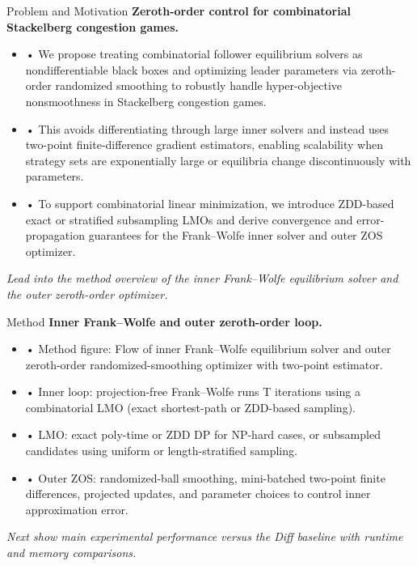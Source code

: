 \documentclass{beamer}
\begin{document}
\begin{frame}{Problem and Motivation}
    \textbf{Zeroth-order control for combinatorial Stackelberg congestion games.}
    \vspace{1em}
    \begin{itemize}
        \item • We propose treating combinatorial follower equilibrium solvers as nondifferentiable black boxes and optimizing leader parameters via zeroth-order randomized smoothing to robustly handle hyper-objective nonsmoothness in Stackelberg congestion games.
        \item • This avoids differentiating through large inner solvers and instead uses two-point finite-difference gradient estimators, enabling scalability when strategy sets are exponentially large or equilibria change discontinuously with parameters.
        \item • To support combinatorial linear minimization, we introduce ZDD-based exact or stratified subsampling LMOs and derive convergence and error-propagation guarantees for the Frank–Wolfe inner solver and outer ZOS optimizer.
    \end{itemize}
    \vspace{1em}
    \textit{Lead into the method overview of the inner Frank–Wolfe equilibrium solver and the outer zeroth-order optimizer.}
\end{frame}

\begin{frame}{Method}
    \textbf{Inner Frank–Wolfe and outer zeroth-order loop.}
    \vspace{1em}
    \begin{itemize}
        \item • Method figure: Flow of inner Frank–Wolfe equilibrium solver and outer zeroth-order randomized-smoothing optimizer with two-point estimator.
        \item • Inner loop: projection-free Frank–Wolfe runs T iterations using a combinatorial LMO (exact shortest-path or ZDD-based sampling).
        \item • LMO: exact poly-time or ZDD DP for NP-hard cases, or subsampled candidates using uniform or length-stratified sampling.
        \item • Outer ZOS: randomized-ball smoothing, mini-batched two-point finite differences, projected updates, and parameter choices to control inner approximation error.
    \end{itemize}
    \vspace{1em}
    \textit{Next show main experimental performance versus the Diff baseline with runtime and memory comparisons.}
\end{frame}
\end{document}
